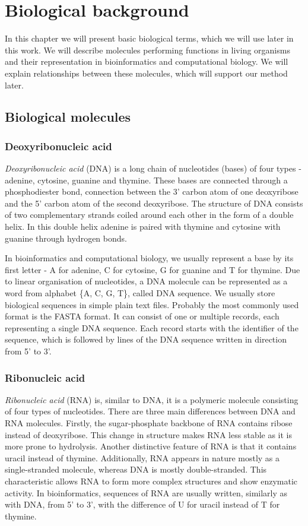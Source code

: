 \chapter{Biological background}
In this chapter we will present basic biological terms, which we will use later in this work.
We will describe molecules performing functions in living organisms and their representation in bioinformatics and computational biology.
We will explain relationships between these molecules, which will support our method later.

\section{Biological molecules}

\subsection{Deoxyribonucleic acid}
\emph{Deoxyribonucleic acid} (DNA) is a long chain of nucleotides (bases) of four types - adenine, cytosine, guanine and thymine.
These bases are connected through a phosphodiester bond, connection between the 3' carbon atom of one deoxyribose and the 5' carbon atom of the second deoxyribose.
The structure of DNA consists of two complementary strands coiled around each other in the form of a double helix.
In this double helix adenine is paired with thymine and cytosine with guanine through hydrogen bonds.

In bioinformatics and computational biology, we usually represent a base by its first letter - A for adenine, C for cytosine, G for guanine and T for thymine.
Due to linear organisation of nucleotides, a DNA molecule can be represented as a word from alphabet \{A, C, G, T\}, called DNA sequence. We usually store biological sequences in simple plain text files.
Probably the most commonly used format is the FASTA format.
It can consist of one or multiple records, each representing a single DNA sequence.
Each record starts with the identifier of the sequence, which is followed by lines of the DNA sequence written in direction from 5' to 3'.

\subsection{Ribonucleic acid}
\emph{Ribonucleic acid} (RNA) is, similar to DNA, it is a polymeric molecule consisting of four types of nucleotides.
There are three main differences between DNA and RNA molecules.
Firstly, the sugar-phosphate backbone of RNA contains ribose instead of deoxyribose.
This change in structure makes RNA less stable as it is more prone to hydrolysis.
Another distinctive feature of RNA is that it contains uracil instead of thymine.
Additionally, RNA appears in nature mostly as a single-stranded molecule, whereas DNA is mostly double-stranded.
This characteristic allows RNA to form more complex structures and show enzymatic activity.
In bioinformatics, sequences of RNA are usually written, similarly as with DNA, from 5' to 3', with the difference of U for uracil instead of T for thymine.

